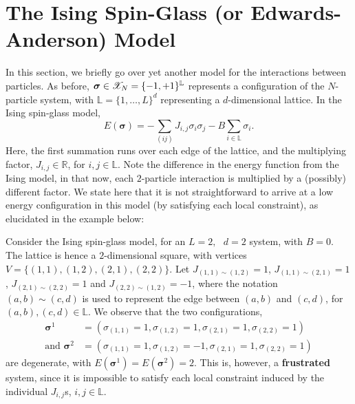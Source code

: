 \documentclass[letterpaper,english,10pt]{article}
\begin{document}
\section{The Ising Spin-Glass (or Edwards-Anderson) Model}
In this section, we briefly go over yet another model for the interactions between particles. As before, $\bm{\sigma}\in \mathscr{X}_{N} = \{-1,+1\}^{\mathbb{L}}$ represents a configuration of the $N$-particle system, with $\mathbb{L}=\{1,\ldots,L\}^{d}$ representing a $d$-dimensional lattice.
In the Ising spin-glass model,
\begin{equation*}
    E(\bm{\sigma}) = -\sum_{(ij)}J_{i,j}\sigma_i\sigma_j - B\sum_{i\in \mathbb{L}}\sigma_i.
\end{equation*}
Here, the first summation runs over each edge of the lattice, and the multiplying factor, $J_{i,j}\in \mathbb{R}$, for $i,j\in \mathbb{L}$. Note the difference in the energy function from the Ising model, in that now, each $2$-particle interaction is multiplied by a (possibly) different factor.
We state here that it is not straightforward to arrive at a low energy configuration in this model (by satisfying each local constraint), as elucidated in the example below:
\begin{shaded*}
\begin{exmp}
Consider the Ising spin-glass model, for an $L=2,\text{ }d=2$ system, with $B=0$. The lattice is hence a $2$-dimensional square, with vertices $V=\{(1,1),(1,2),(2,1),(2,2)\}$.
Let $J_{(1,1)\sim (1,2)}=1$, $J_{(1,1)\sim (2,1)}=1$, $J_{(2,1)\sim (2,2)}=1$ and $J_{(2,2)\sim (1,2)}=-1$, where the notation $(a,b)\sim (c,d)$ is used to represent the edge between $(a,b)$ and $(c,d)$, for $(a,b),(c,d)\in \mathbb{L}$. We observe that the two configurations,
\begin{align*}
    \bm{\sigma}^{1} &= \left(\sigma_{(1,1)}=1,\sigma_{(1,2)}=1,\sigma_{(2,1)}=1,\sigma_{(2,2)}=1\right)\\
    \text{and }\bm{\sigma}^{2} &= \left(\sigma_{(1,1)}=1,\sigma_{(1,2)}=-1,\sigma_{(2,1)}=1,\sigma_{(2,2)}=1\right)
\end{align*}
are degenerate, with $E(\bm{\sigma}^{1})=E(\bm{\sigma}^{2})=2$. This is, however, a \textbf{frustrated} system, since it is impossible to satisfy each local constraint induced by the individual $J_{i,j}$s, $i,j\in \mathbb{L}$.
\end{exmp}
\end{shaded*}
\end{document}
